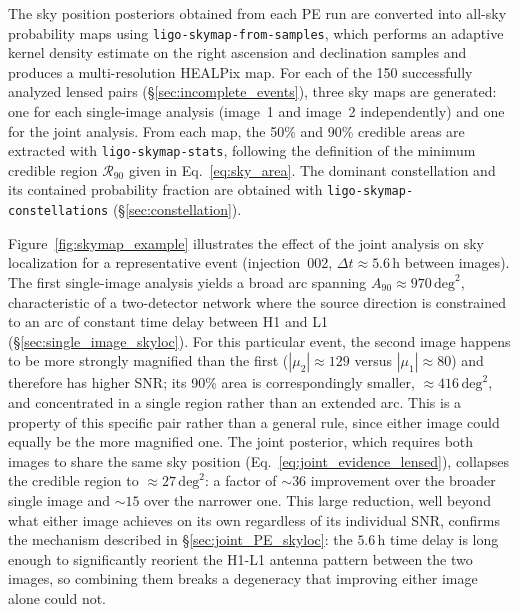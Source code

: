 The sky position posteriors obtained from each PE run are converted into all-sky probability maps using \texttt{ligo-skymap-from-samples}, which performs an adaptive kernel density estimate on the right ascension and declination samples and produces a multi-resolution HEALPix \cite{Gorski2005} map. For each of the 150 successfully analyzed lensed pairs (\S\ref{sec:incomplete_events}), three sky maps are generated: one for each single-image analysis (image~1 and image~2 independently) and one for the joint analysis. From each map, the 50\% and 90\% credible areas are extracted with \texttt{ligo-skymap-stats}, following the definition of the minimum credible region $\mathcal{R}_{90}$ given in Eq.~\eqref{eq:sky_area}. The dominant constellation and its contained probability fraction are obtained with \texttt{ligo-skymap-constellations} (\S\ref{sec:constellation}).

Figure~\ref{fig:skymap_example} illustrates the effect of the joint analysis on sky localization for a representative event (injection~002, $\Delta t \approx 5.6$\,h between images). The first single-image analysis yields a broad arc spanning $A_{90} \approx 970\,\mathrm{deg}^2$, characteristic of a two-detector network where the source direction is constrained to an arc of constant time delay between H1 and L1 (\S\ref{sec:single_image_skyloc}). For this particular event, the second image happens to be more strongly magnified than the first ($|\mu_2|\approx129$ versus $|\mu_1|\approx80$) and therefore has higher SNR; its 90\% area is correspondingly smaller, $\approx 416\,\mathrm{deg}^2$, and concentrated in a single region rather than an extended arc. This is a property of this specific pair rather than a general rule, since either image could equally be the more magnified one. The joint posterior, which requires both images to share the same sky position (Eq.~\eqref{eq:joint_evidence_lensed}), collapses the credible region to $\approx 27\,\mathrm{deg}^2$: a factor of $\sim\!36$ improvement over the broader single image and $\sim\!15$ over the narrower one. This large reduction, well beyond what either image achieves on its own regardless of its individual SNR, confirms the mechanism described in \S\ref{sec:joint_PE_skyloc}: the $5.6$\,h time delay is long enough to significantly reorient the H1-L1 antenna pattern between the two images, so combining them breaks a degeneracy that improving either image alone could not.

